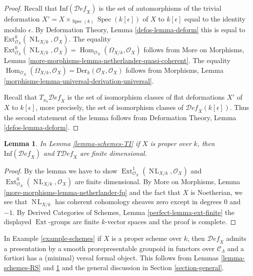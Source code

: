 \documentclass{stacks-project}
\theoremstyle{plain}
\newtheorem{lemma}[subsection]{Lemma}
\theoremstyle{definition}
\theoremstyle{remark}
\numberwithin{equation}{subsection}
\def\Spec{\mathop{\mathrm{Spec}}}
\def\Hom{\mathop{\mathrm{Hom}}\nolimits}
\def\Ext{\mathop{\mathrm{Ext}}\nolimits}
\def\NL{\mathop{N\!L}\nolimits}
\def\Deformationcategory{\mathcal{D}\!\mathit{ef}}
\begin{document}
\begin{proof}
Recall that $\text{Inf}(\Deformationcategory_X)$ is the set of
automorphisms of the trivial deformation
$X' = X \times_{\Spec(k)} \Spec(k[\epsilon])$ of $X$ to $k[\epsilon]$
equal to the identity modulo $\epsilon$.
By Deformation Theory, Lemma \ref{defos-lemma-deform}
this is equal to $\text{Ext}^0_{\mathcal{O}_X}(\NL_{X/k}, \mathcal{O}_X)$.
The equality $\text{Ext}^0_{\mathcal{O}_X}(\NL_{X/k}, \mathcal{O}_X) =
\Hom_{\mathcal{O}_X}(\Omega_{X/k}, \mathcal{O}_X)$ follows from
More on Morphisms, Lemma
\ref{more-morphisms-lemma-netherlander-quasi-coherent}.
The equality
$\Hom_{\mathcal{O}_X}(\Omega_{X/k}, \mathcal{O}_X) =
\text{Der}_k(\mathcal{O}_X, \mathcal{O}_X)$
follows from Morphisms, Lemma
\ref{morphisms-lemma-universal-derivation-universal}.

\medskip\noindent
Recall that $T_{x_0}\Deformationcategory_X$ is the set of isomorphism classes
of flat deformations $X'$ of $X$ to $k[\epsilon]$, more precisely,
the set of isomorphism classes of $\Deformationcategory_X(k[\epsilon])$.
Thus the second statement of the lemma follows from
Deformation Theory, Lemma \ref{defos-lemma-deform}.
\end{proof}

\begin{lemma}
\label{lemma-proper-schemes-TI}
In Lemma \ref{lemma-schemes-TI} if $X$ is proper over $k$, then
$\text{Inf}(\Deformationcategory_X)$ and $T\Deformationcategory_X$ are
finite dimensional.
\end{lemma}

\begin{proof}
By the lemma we have to show
$\Ext^1_{\mathcal{O}_X}(\NL_{X/k}, \mathcal{O}_X)$ and
$\Ext^0_{\mathcal{O}_X}(\NL_{X/k}, \mathcal{O}_X)$ are finite
dimensional. By More on Morphisms, Lemma
\ref{more-morphisms-lemma-netherlander-fp}
and the fact that $X$ is Noetherian, we see that
$\NL_{X/k}$ has coherent cohomology sheaves zero except
in degrees $0$ and $-1$.
By Derived Categories of Schemes, Lemma \ref{perfect-lemma-ext-finite}
the displayed $\Ext$-groups are finite $k$-vector spaces
and the proof is complete.
\end{proof}

\noindent
In Example \ref{example-schemes} if $X$ is a proper scheme over $k$,
then $\Deformationcategory_X$
admits a presentation by a smooth prorepresentable groupoid in functors
over $\mathcal{C}_\Lambda$
and a fortiori has a (minimal) versal formal object. This follows
from Lemmas \ref{lemma-schemes-RS} and
\ref{lemma-proper-schemes-TI}
and the general discussion in Section \ref{section-general}.
\end{document}
